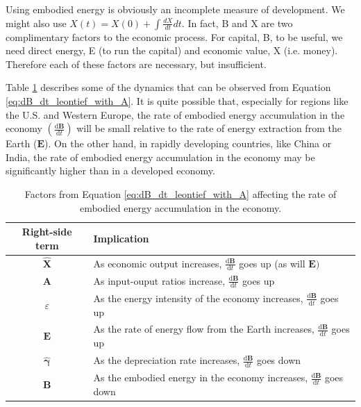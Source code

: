 \documentclass[authoryear,preprint,review,12pt]{elsarticle}
\let\oldhat\hat
\renewcommand{\vec}[1]{\mathbf{#1}}
\renewcommand{\hat}[1]{\oldhat{\mathbf{#1}}}
\begin{document}

Using embodied energy is obviously an incomplete measure of development. We might also use $X(t) = X(0) + \int\frac{dX}{dt}dt$. In fact, B and X are two complimentary factors to the economic process. For capital, B, to be useful, we need direct energy, E (to run the capital) and economic value, X (i.e. money). Therefore each of these factors are necessary, but insufficient.

Table \ref{table:embodied_energy_accumulation_factors} describes some of the dynamics that can be observed from Equation \ref{eq:dB_dt_leontief_with_A}. It is quite possible that, especially for regions like the U.S. and Western Europe, the rate of embodied energy accumulation in the economy $\left(\frac{\mathrm{d}\vec{B}}{\mathrm{d}t}\right)$ will be small relative to the rate of energy extraction from the Earth ($\vec{E}$). On the other hand, in rapidly developing countries, like China or India, the rate of embodied energy accumulation in the economy may be significantly higher than in a developed economy.



\begin{table}
\caption{Factors from Equation \ref{eq:dB_dt_leontief_with_A} affecting the rate of embodied energy accumulation in the economy.}
\begin{center}
  \begin{tabular}{| c | l | }
    \hline
    Right-side term & Implication \\ \hline
    $\hat{\vec{X}}$ & As economic output increases, $\frac{\mathrm{d}\vec{B}}{\mathrm{d}t}$ goes up (as will $\vec{E})$  \\ \hline
    $\vec{A}$ & As input-ouput ratios increase, $\frac{\mathrm{d}\vec{B}}{\mathrm{d}t}$ goes up  \\ \hline
    $\varepsilon$ & As the energy intensity of the economy increases, $\frac{\mathrm{d}\vec{B}}{\mathrm{d}t}$ goes up  \\ \hline
   $ \vec{E}$ & As the rate of energy flow from the Earth increases, $\frac{\mathrm{d}\vec{B}}{\mathrm{d}t}$ goes up  \\ \hline
    $\hat{\vec{\gamma}}$ & As the depreciation rate increases, $\frac{\mathrm{d}\vec{B}}{\mathrm{d}t}$ goes down  \\ \hline
    $\vec{B}$ & As the embodied energy in the economy increases, $\frac{\mathrm{d}\vec{B}}{\mathrm{d}t}$ goes down  \\ \hline
  \end{tabular}
\end{center}
\label{table:embodied_energy_accumulation_factors}
\end{table}
\end{document}
